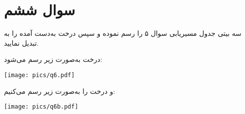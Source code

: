 \section{سوال ششم}

 سه بیتی جدول مسیریابی سوال ۵ را رسم نموده و سپس درخت به‌دست آمده را به  تبدیل نمایید.


\begin{qsolve}
	درخت  به‌صورت زیر رسم می‌شود:
	
	\begin{center}
		\texttt{[image: pics/q6.pdf]}
	\end{center}
	
	
	و درخت  را به‌صورت زیر رسم می‌کنیم:
\end{qsolve}

\begin{qsolve}
	\begin{center}
		\texttt{[image: pics/q6b.pdf]}
	\end{center}
\end{qsolve}